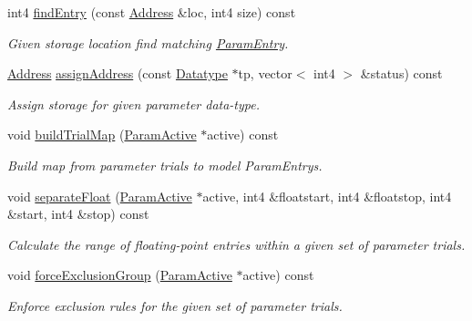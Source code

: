\begin{DoxyCompactItemize}
\item 
int4 \mbox{\hyperlink{class_param_list_standard_a8cc59fbeecbf61a1acc32ce2f333788e}{find\+Entry}} (const \mbox{\hyperlink{class_address}{Address}} \&loc, int4 size) const
\begin{DoxyCompactList}\small\item\em Given storage location find matching \mbox{\hyperlink{class_param_entry}{Param\+Entry}}. \end{DoxyCompactList}\item 
\mbox{\hyperlink{class_address}{Address}} \mbox{\hyperlink{class_param_list_standard_a3775b16cc55e45ffb7c6626e99a935b7}{assign\+Address}} (const \mbox{\hyperlink{class_datatype}{Datatype}} $\ast$tp, vector$<$ int4 $>$ \&status) const
\begin{DoxyCompactList}\small\item\em Assign storage for given parameter data-\/type. \end{DoxyCompactList}\item 
void \mbox{\hyperlink{class_param_list_standard_ad417701f25ded842e652c57cf8216fad}{build\+Trial\+Map}} (\mbox{\hyperlink{class_param_active}{Param\+Active}} $\ast$active) const
\begin{DoxyCompactList}\small\item\em Build map from parameter trials to model Param\+Entrys. \end{DoxyCompactList}\item 
void \mbox{\hyperlink{class_param_list_standard_aacdd4138b9b70be59a0033514cbb6abb}{separate\+Float}} (\mbox{\hyperlink{class_param_active}{Param\+Active}} $\ast$active, int4 \&floatstart, int4 \&floatstop, int4 \&start, int4 \&stop) const
\begin{DoxyCompactList}\small\item\em Calculate the range of floating-\/point entries within a given set of parameter {\itshape trials}. \end{DoxyCompactList}\item 
void \mbox{\hyperlink{class_param_list_standard_a97ad61c3065470a692b401d3234f642a}{force\+Exclusion\+Group}} (\mbox{\hyperlink{class_param_active}{Param\+Active}} $\ast$active) const
\begin{DoxyCompactList}\small\item\em Enforce exclusion rules for the given set of parameter trials. \end{DoxyCompactList}\item 

\end{DoxyCompactItemize}
